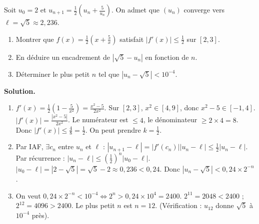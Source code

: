 \documentclass[11pt]{article}
\begin{document}
\begin{exoresolu}
Soit $u_0 = 2$ et $u_{n+1} = \frac{1}{2}\left(u_n + \frac{5}{u_n}\right)$.
On admet que $(u_n)$ converge vers $\ell = \sqrt{5} \approx 2{,}236$.
\begin{enumerate}
    \item Montrer que $f(x)=\frac{1}{2}(x+\frac{5}{x})$ satisfait $|f'(x)| \le \frac{1}{2}$ sur $[2, 3]$.
    \item En déduire un encadrement de $|\sqrt{5} - u_n|$ en fonction de $n$.
    \item Déterminer le plus petit $n$ tel que $|u_n - \sqrt{5}| < 10^{-4}$.
\end{enumerate}
\tcblower
\textbf{Solution.}
\begin{enumerate}
    \item $f'(x) = \frac{1}{2}\left(1 - \frac{5}{x^2}\right) = \frac{x^2-5}{2x^2}$.
    Sur $[2, 3]$, $x^2 \in [4, 9]$, donc $x^2-5 \in [-1, 4]$.
    $|f'(x)| = \frac{|x^2-5|}{2x^2}$.
    Le numérateur est $\le 4$, le dénominateur $\ge 2\times 4 = 8$.
    Donc $|f'(x)| \le \frac{4}{8} = \frac{1}{2}$. On peut prendre $k = \frac{1}{2}$.
    \item Par IAF, $\exists c_n$ entre $u_n$ et $\ell$ : $|u_{n+1}-\ell| = |f'(c_n)||u_n-\ell| \le \frac{1}{2}|u_n-\ell|$.
    Par récurrence : $|u_n-\ell| \le \left(\frac{1}{2}\right)^n |u_0-\ell|$.
    $|u_0-\ell| = |2-\sqrt{5}| = \sqrt{5}-2 \approx 0{,}236 < 0{,}24$.
    Donc $|u_n - \sqrt{5}| < 0{,}24 \times 2^{-n}$.
    \item On veut $0{,}24 \times 2^{-n} < 10^{-4} \iff 2^n > 0{,}24 \times 10^4 = 2400$.
    $2^{11} = 2048 < 2400$ ; $2^{12} = 4096 > 2400$.
    Le plus petit $n$ est \textbf{$n=12$}.
    (Vérification : $u_{12}$ donne $\sqrt{5}$ à $10^{-4}$ près).
\end{enumerate}
\end{exoresolu}
\end{document}
